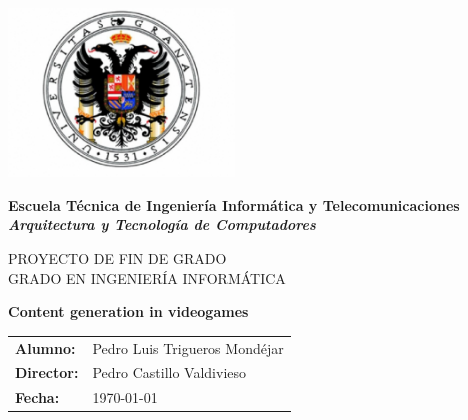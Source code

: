 %
%

%

\begin{titlepage}

	\begin{center}
		
		\includegraphics[width=6cm]{./eps/logo-ugr.eps}
		\vspace{2cm}

		{\Large{\textbf{Escuela Técnica de Ingeniería Informática y Telecomunicaciones}}}
		\\
		{\it \large{\textbf{Arquitectura y Tecnología de Computadores}}}
		\vspace{1cm}

		{\large PROYECTO DE FIN DE GRADO\\GRADO EN INGENIERÍA INFORMÁTICA}
		\vspace{1cm}

		\textbf{\Large Content generation in videogames}
		\vspace{7cm}
	\end{center}

	\begin{flushright}
		\begin{tabular}{ll}
			\large{\textbf{Alumno:}}	&
			\large{Pedro Luis Trigueros Mondéjar} \\

			\large{\textbf{Director:}}	&
			\large{Pedro Castillo Valdivieso} \\

			\large{\textbf{Fecha:}}	&
			\large{\today} \\
		\end{tabular}
	\end{flushright}

\end{titlepage}
